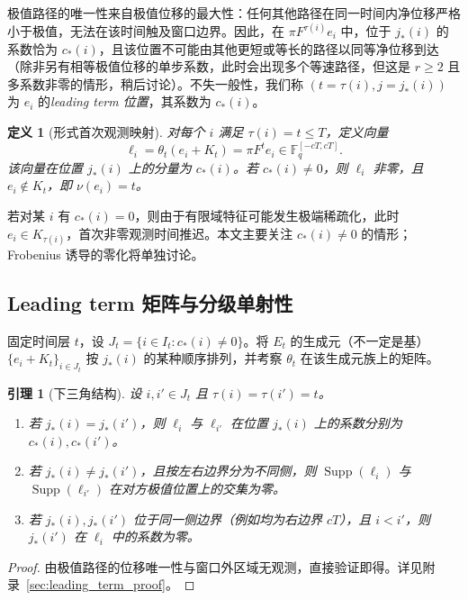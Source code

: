 \documentclass[11pt,a4paper]{ctexart}
\newtheorem{lemma}[theorem]{引理}
\newtheorem{definition}[theorem]{定义}
\newcommand{\F}{\mathbb{F}}
\DeclareMathOperator{\Supp}{Supp}
\begin{document}
极值路径的唯一性来自极值位移的最大性：任何其他路径在同一时间内净位移严格小于极值，无法在该时间触及窗口边界。因此，在 \(\pi F^{\tau(i)} e_i\) 中，位于 \(j_*(i)\) 的系数恰为 \(c_*(i)\)，且该位置不可能由其他更短或等长的路径以同等净位移到达（除非另有相等极值位移的单步系数，此时会出现多个等速路径，但这是 \(r\ge2\) 且多系数非零的情形，稍后讨论）。不失一般性，我们称 \((t=\tau(i), j=j_*(i))\) 为 \(e_i\) 的\emph{leading term 位置}，其系数为 \(c_*(i)\)。

\begin{definition}[形式首次观测映射]
对每个 \(i\) 满足 \(\tau(i)=t\le T\)，定义向量
\[
\ell_i = \theta_t(e_i + K_t) = \pi F^t e_i \in \F_q^{[-cT,cT]}.
\]
该向量在位置 \(j_*(i)\) 上的分量为 \(c_*(i)\)。若 \(c_*(i)\neq0\)，则 \(\ell_i\) 非零，且 \(e_i\notin K_t\)，即 \(\nu(e_i)=t\)。
\end{definition}

若对某 \(i\) 有 \(c_*(i)=0\)，则由于有限域特征可能发生极端稀疏化，此时 \(e_i\in K_{\tau(i)}\)，首次非零观测时间推迟。本文主要关注 \(c_*(i)\neq0\) 的情形；Frobenius 诱导的零化将单独讨论。

\subsection{Leading term 矩阵与分级单射性}
固定时间层 \(t\)，设 \(J_t = \{i\in I_t : c_*(i)\neq0\}\)。将 \(E_t\) 的生成元（不一定是基）\(\{e_i + K_t\}_{i\in J_t}\) 按 \(j_*(i)\) 的某种顺序排列，并考察 \(\theta_t\) 在该生成元族上的矩阵。

\begin{lemma}[下三角结构]\label{lem:theta_t_triangular}
设 \(i,i'\in J_t\) 且 \(\tau(i)=\tau(i')=t\)。
\begin{enumerate}[label=(\roman*)]
    \item 若 \(j_*(i) = j_*(i')\)，则 \(\ell_i\) 与 \(\ell_{i'}\) 在位置 \(j_*(i)\) 上的系数分别为 \(c_*(i),c_*(i')\)。
    \item 若 \(j_*(i) \neq j_*(i')\)，且按左右边界分为不同侧，则 \(\Supp(\ell_i)\) 与 \(\Supp(\ell_{i'})\) 在对方极值位置上的交集为零。
    \item 若 \(j_*(i),j_*(i')\) 位于同一侧边界（例如均为右边界 \(cT\)），且 \(i < i'\)，则 \(j_*(i')\) 在 \(\ell_i\) 中的系数为零。
\end{enumerate}
\end{lemma}
\begin{proof}
由极值路径的位移唯一性与窗口外区域无观测，直接验证即得。详见附录~\ref{sec:leading_term_proof}。
\end{proof}
\end{document}
